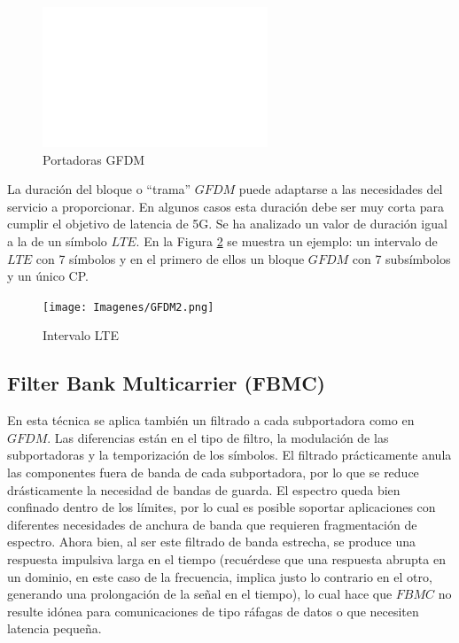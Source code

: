 \documentclass[]{article}
\begin{document}
\begin{figure}[h!]
	\centering
	\includegraphics[width=0.6\textwidth]{Imagenes/GFDM.png}
	\caption{Portadoras GFDM}
	\label{fig:GFDM}
\end{figure}


La duración del bloque o “trama” $GFDM$ puede adaptarse a las necesidades del servicio a proporcionar. En algunos casos esta duración debe ser muy corta para cumplir el objetivo de latencia de 5G. Se ha analizado un valor de duración igual a la de un símbolo $LTE$. 
En la Figura \ref{fig:GFDM2} se muestra un ejemplo: un intervalo de $LTE$ con 7 símbolos y en el primero de ellos un bloque $GFDM$ con 7 subsímbolos y un único CP.\\

\begin{figure}[h!]
	\centering
	\texttt{[image: Imagenes/GFDM2.png]}
	\caption{Intervalo LTE}
	\label{fig:GFDM2}
\end{figure}

 

\subsection{Filter Bank Multicarrier (FBMC)}
 
En esta técnica se aplica también un filtrado a cada subportadora como en $GFDM$. Las diferencias están en el tipo de filtro, la modulación de las subportadoras y la temporización de los símbolos. El filtrado prácticamente anula las componentes fuera de banda de cada subportadora, por lo que se reduce drásticamente la necesidad de bandas de guarda. El espectro queda bien confinado dentro de los límites, por lo cual es posible soportar aplicaciones con diferentes necesidades de anchura de banda que requieren fragmentación de espectro. Ahora bien, al ser este filtrado de banda estrecha, se produce una respuesta impulsiva larga en el tiempo (recuérdese que una respuesta abrupta en un dominio, en este caso de la frecuencia, implica justo lo contrario en el otro, generando una prolongación de la señal en el tiempo), lo cual hace que $FBMC$ no resulte idónea para comunicaciones de tipo ráfagas de datos o que necesiten latencia pequeña.\\
\end{document}
